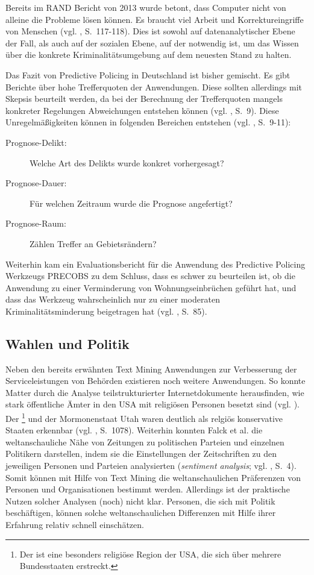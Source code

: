 Bereits im RAND Bericht von 2013 wurde betont, dass Computer nicht von alleine die Probleme
lösen können. Es braucht viel Arbeit und Korrektureingriffe von Menschen (vgl. \cite{Perry}, S.~117-118). 
Dies ist sowohl auf datenanalytischer Ebene der Fall, als auch auf der sozialen Ebene, auf der
\grqq{} notwendig ist, um das Wissen über die konkrete Kriminalitätsumgebung auf dem
neuesten Stand zu halten. 

Das Fazit von Predictive Policing in Deutschland ist bisher gemischt. Es gibt Berichte über hohe
Trefferquoten der Anwendungen. Diese sollten allerdings mit Skepsis beurteilt
werden, da bei der Berechnung der Trefferquoten mangels konkreter Regelungen Abweichungen
entstehen können (vgl. \cite{Bode}, S.~9).
Diese Unregelmäßigkeiten können in folgenden Bereichen entstehen (vgl. \cite{Bode}, S.~9-11):

\begin{description}
\item[Prognose-Delikt:] Welche Art des Delikts wurde konkret vorhergesagt?
\item[Prognose-Dauer:] Für welchen Zeitraum wurde die Prognose angefertigt?
\item[Prognose-Raum:] Zählen Treffer an Gebietsrändern?
\end{description}

Weiterhin kam ein Evaluationsbericht für die Anwendung des Predictive Policing Werkzeugs PRECOBS
zu dem Schluss, dass es schwer zu beurteilen ist, ob die Anwendung zu einer Verminderung von
Wohnungseinbrüchen geführt hat, und dass das Werkzeug wahrscheinlich nur zu einer moderaten Kriminalitätsminderung
beigetragen hat (vgl. \cite{Gerstner}, S.~85).  

\subsection{Wahlen und Politik}

Neben den bereits erwähnten Text Mining Anwendungen zur Verbesserung der Serviceleistungen
von Behörden existieren noch weitere \grqq{} Anwendungen. So konnte Matter durch
die Analyse teilstrukturierter Internetdokumente herausfinden, wie stark öffentliche Ämter in den USA
mit religiösen Personen besetzt sind (vgl. \cite{Matter}). Der \grqq{}\footnote{
Der \grqq{} ist eine besonders religiöse Region der USA, die sich über mehrere Bundesstaaten erstreckt.
} und der Mormonenstaat Utah waren deutlich als relgiös konservative Staaten erkennbar (vgl. \cite{Matter}, S.~1078).
Weiterhin konnten Falck et al. die weltanschauliche Nähe von Zeitungen zu politischen Parteien und einzelnen Politikern
darstellen, indem sie die Einstellungen der Zeitschriften zu den jeweiligen Personen und Parteien analysierten
(\emph{sentiment analysis}; vgl. \cite{Falck}, S.~4). Somit können mit Hilfe von Text Mining die weltanschaulichen Präferenzen
von Personen und Organisationen bestimmt werden. Allerdings ist der praktische Nutzen solcher Analysen (noch) nicht klar.
Personen, die sich mit Politik beschäftigen, können solche weltanschaulichen Differenzen mit Hilfe ihrer Erfahrung relativ
schnell einschätzen.

